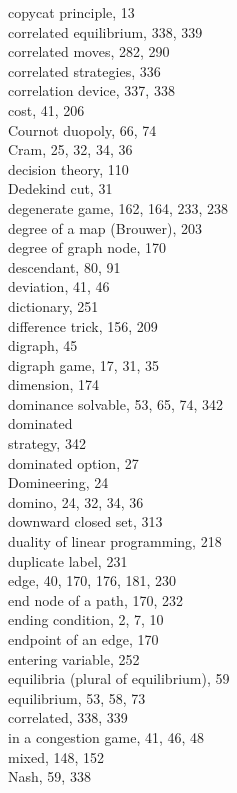 \documentclass[12pt]{article}
\begin{document}
copycat principle, 13\\
correlated equilibrium, 338, 339\\
correlated moves, 282, 290\\
correlated strategies, 336\\
correlation device, 337, 338\\
cost, 41, 206\\
Cournot duopoly, 66, 74\\
Cram, 25, 32, 34, 36\\
decision theory, 110\\
Dedekind cut, 31\\
degenerate game, 162, 164, 233, 238\\
degree of a map (Brouwer), 203\\
degree of graph node, 170\\
descendant, 80, 91\\
deviation, 41, 46\\
dictionary, 251\\
difference trick, 156, 209\\
digraph, 45\\
digraph game, 17, 31, 35\\
dimension, 174\\
dominance solvable, 53, 65, 74, 342\\
dominated\\
strategy, 342\\
dominated option, 27\\
Domineering, 24\\
domino, 24, 32, 34, 36\\
downward closed set, 313\\
duality of linear programming, 218\\
duplicate label, 231\\
edge, 40, 170, 176, 181, 230\\
end node of a path, 170, 232\\
ending condition, 2, 7, 10\\
endpoint of an edge, 170\\
entering variable, 252\\
equilibria (plural of equilibrium), 59\\
equilibrium, 53, 58, 73\\
correlated, 338, 339\\
in a congestion game, 41, 46, 48\\
mixed, 148, 152\\
Nash, 59, 338\\
\end{document}
